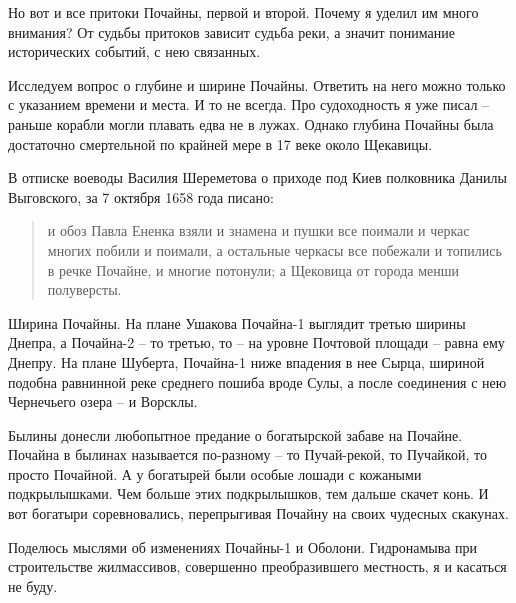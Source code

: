 Но вот и все притоки Почайны, первой и второй. Почему я уделил им много внимания? От судьбы притоков зависит судьба реки, а значит понимание исторических событий, с нею связанных.

Исследуем вопрос о глубине и ширине Почайны. Ответить на него можно только с указанием времени и места. И то не всегда. Про судоходность я уже писал – раньше корабли могли плавать едва не в лужах. Однако глубина Почайны была достаточно смертельной по крайней мере в 17 веке около Щекавицы.

В отписке воеводы Василия Шереметова о приходе под Киев полковника Данилы Выговского, за 7 октября 1658 года\cite[том 15, стр. 258]{akty} писано:

\begin{quotation}
и обоз Павла Ененка взяли и знамена и пушки все поимали и черкас многих побили и поимали, а остальные черкасы все побежали и топились в речке Почайне, и многие потонули; а Щековица от города менши полуверсты.
\end{quotation}

Ширина Почайны. На плане Ушакова Почайна-1 выглядит третью ширины Днепра, а Почайна-2 – то третью, то – на уровне Почтовой площади – равна ему Днепру. На плане Шуберта, Почайна-1 ниже впадения в нее Сырца, шириной подобна равнинной реке среднего пошиба вроде Сулы, а после соединения с нею Чернечьего озера – и Ворсклы.  

Былины донесли любопытное предание о богатырской забаве на Почайне. Почайна в былинах называется по-разному – то Пучай-рекой, то Пучайкой, то просто Почайной. А у богатырей были особые лошади с кожаными подкрылышками. Чем больше этих подкрылышков, тем дальше скачет конь. И вот богатыри соревновались, перепрыгивая Почайну на своих чудесных скакунах.

Поделюсь мыслями об изменениях Почайны-1 и Оболони. Гидронамыва при строительстве жилмассивов, совершенно преобразившего местность, я и касаться не буду.



